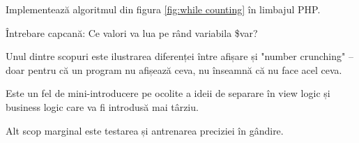 \begin{Exercise}[title={Numărătoarea din 1 în 1 cu while},difficulty=1]
\ExePart
Implementează algoritmul din figura \ref{fig:while counting} în limbajul PHP.

\ExePart
Întrebare capcană: Ce valori va lua pe rând variabila \$var?
\end{Exercise}

Unul dintre scopuri este ilustrarea diferenței între afișare și "number
crunching" -- doar pentru că un program nu afișează ceva, nu înseamnă că nu
face acel ceva.

Este un fel de mini-introducere pe ocolite a ideii de separare în view logic și
business logic care va fi introdusă mai târziu.

Alt scop marginal este testarea și antrenarea preciziei în gândire.
